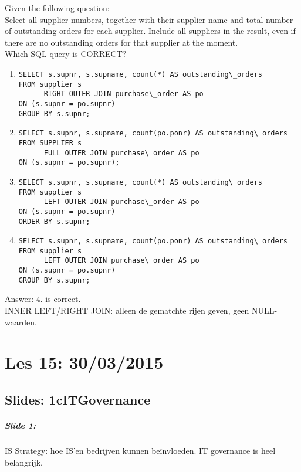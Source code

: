 \documentclass[10pt,a4paper]{report}
\begin{document}
Given the following question:\\
Select all supplier numbers, together with their supplier name and total number of outstanding orders for each supplier. Include all suppliers in the result, even if there are no outstanding orders for that supplier at the moment.\\
Which SQL query is CORRECT?
\begin{enumerate}
\item 
\begin{verbatim}
SELECT s.supnr, s.supname, count(*) AS outstanding\_orders
FROM supplier s
      RIGHT OUTER JOIN purchase\_order AS po 
ON (s.supnr = po.supnr)
GROUP BY s.supnr;
\end{verbatim}
\item 
\begin{verbatim}
SELECT s.supnr, s.supname, count(po.ponr) AS outstanding\_orders
FROM SUPPLIER s 
      FULL OUTER JOIN purchase\_order AS po 
ON (s.supnr = po.supnr);
\end{verbatim}
\item 
\begin{verbatim}
SELECT s.supnr, s.supname, count(*) AS outstanding\_orders
FROM supplier s 
      LEFT OUTER JOIN purchase\_order AS po
ON (s.supnr = po.supnr)
ORDER BY s.supnr;
\end{verbatim}
\item 
\begin{verbatim}
SELECT s.supnr, s.supname, count(po.ponr) AS outstanding\_orders
FROM supplier s 
      LEFT OUTER JOIN purchase\_order AS po 
ON (s.supnr = po.supnr)
GROUP BY s.supnr;
\end{verbatim}
\end{enumerate}
Answer: 4. is correct.\\

INNER LEFT/RIGHT JOIN: alleen de gematchte rijen geven, geen NULL-waarden. 

\chapter{Les 15: 30/03/2015}
\section{Slides: 1cITGovernance}

\paragraph{Slide 1:} IS Strategy: hoe IS'en bedrijven kunnen beïnvloeden.
IT governance is heel belangrijk.
\end{document}

